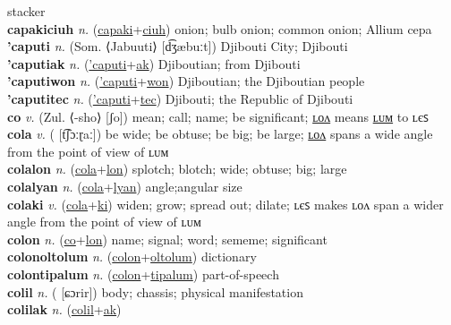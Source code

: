 stacker \label{capakiles} \\
\textbf{capakiciuh} \textit{n.} (\hyperref[capaki]{capaki}+\hyperref[ciuh]{ciuh})
onion; bulb onion; common onion; Allium cepa \label{capakiciuh} \\
\textbf{'caputi} \textit{n.} (Som. ⟨Jabuuti⟩ [d͡ʒæbuːt])
Djibouti City; Djibouti \label{'caputi} \\
\textbf{'caputiak} \textit{n.} (\hyperref['caputi]{'caputi}+\hyperref[ak]{ak})
Djiboutian; from Djibouti \label{'caputiak} \\
\textbf{'caputiwon} \textit{n.} (\hyperref['caputi]{'caputi}+\hyperref[won]{won})
Djiboutian; the Djiboutian people \label{'caputiwon} \\
\textbf{'caputitec} \textit{n.} (\hyperref['caputi]{'caputi}+\hyperref[tec]{tec})
Djibouti; the Republic of Djibouti \label{'caputitec} \\
\textbf{co} \textit{v.} (Zul. ⟨-sho⟩ [ʃo])
mean; call; name; be significant; \hyperref[colon]{ʟᴏᴧ} means \hyperref[colum]{ʟᴜᴍ} to ʟєꜱ \label{co} \\
\textbf{cola} \textit{v.} ( [t͡ʃɔːɽaː])
be wide; be obtuse; be big; be large; \hyperref[colalon]{ʟᴏᴧ} spans a wide angle from the point of view of ʟᴜᴍ \label{cola} \\
\textbf{colalon} \textit{n.} (\hyperref[cola]{cola}+\hyperref[lon]{lon})
splotch; blotch; wide; obtuse; big; large \label{colalon} \\
\textbf{colalyan} \textit{n.} (\hyperref[cola]{cola}+\hyperref[lyan]{lyan})
angle;angular size \label{colalyan} \\
\textbf{colaki} \textit{v.} (\hyperref[cola]{cola}+\hyperref[ki]{ki})
widen; grow; spread out; dilate; ʟєꜱ makes ʟᴏᴧ span a wider angle from the point of view of ʟᴜᴍ \label{colaki} \\
\textbf{colon} \textit{n.} (\hyperref[co]{co}+\hyperref[lon]{lon})
name; signal; word; sememe; significant \label{colon} \\
\textbf{colonoltolum} \textit{n.} (\hyperref[colon]{colon}+\hyperref[oltolum]{oltolum})
dictionary \label{colonoltolum} \\
\textbf{colontipalum} \textit{n.} (\hyperref[colon]{colon}+\hyperref[tipalum]{tipalum})
part-of-speech \label{colontipalum} \\
\textbf{colil} \textit{n.} ( [ɕɔrir])
body; chassis; physical manifestation \label{colil} \\
\textbf{colilak} \textit{n.} (\hyperref[colil]{colil}+\hyperref[ak]{ak})
